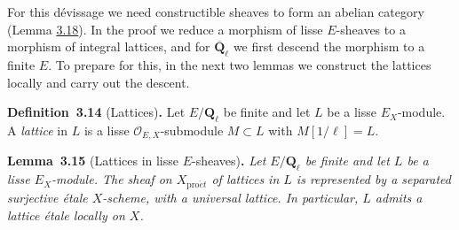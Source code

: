 \documentclass[11pt]{article}
\newenvironment{bpstatement}[2]{\par\addvspace{0.6\baselineskip}\noindent\textbf{#1}#2\textbf{.}\enspace\ignorespaces}
  {\par\addvspace{0.4\baselineskip}}
\newenvironment{bpstatementit}[2]{\begin{bpstatement}{#1}{#2}\itshape\ignorespaces}{\end{bpstatement}}
\begin{document}
For this dévissage we need constructible sheaves to form an abelian category (Lemma \hyperref[bp56]{3.18}). In the proof we reduce a morphism of lisse \(E\)-sheaves to a morphism of integral lattices, and for \(\overline{\mathbf Q}_\ell\) we first descend the morphism to a finite \(E\). To prepare for this, in the next two lemmas we construct the lattices locally and carry out the descent.

\label{bp47}%
\begin{bpstatement}{Definition~3.14}{ (Lattices)}
Let \(E/\mathbf Q_\ell\) be finite and let \(L\) be a lisse \(E_X\)-module. A \emph{lattice} in \(L\) is a lisse \(\mathcal O_{E,X}\)-submodule \(M\subset L\) with \(M[1/\ell]=L\).
\end{bpstatement}

\label{bp48}%
\begin{bpstatementit}{Lemma~3.15}{ (Lattices in lisse $E$-sheaves)}
Let \(E/\mathbf Q_\ell\) be finite and let \(L\) be a lisse \(E_X\)-module. The sheaf on \(X_{\mathrm{pro}\acute{e}t}\) of lattices in \(L\) is represented by a separated surjective étale \(X\)-scheme, with a universal lattice. In particular, \(L\) admits a lattice étale locally on \(X\).
\end{bpstatementit}
\end{document}
